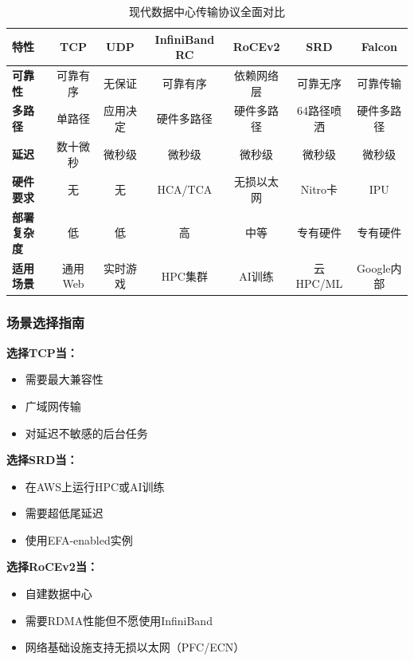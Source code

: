 \begin{table}[h]
\centering
\caption{现代数据中心传输协议全面对比}
\begin{tabular}{p{2.5cm}cccccc}
\toprule
\textbf{特性} & \textbf{TCP} & \textbf{UDP} & \textbf{InfiniBand RC} & \textbf{RoCEv2} & \textbf{SRD} & \textbf{Falcon} \\
\midrule
\textbf{可靠性} & 可靠有序 & 无保证 & 可靠有序 & 依赖网络层 & 可靠无序 & 可靠传输 \\
\textbf{多路径} & 单路径 & 应用决定 & 硬件多路径 & 硬件多路径 & 64路径喷洒 & 硬件多路径 \\
\textbf{延迟} & 数十微秒 & 微秒级 & 微秒级 & 微秒级 & 微秒级 & 微秒级 \\
\textbf{硬件要求} & 无 & 无 & HCA/TCA & 无损以太网 & Nitro卡 & IPU \\
\textbf{部署复杂度} & 低 & 低 & 高 & 中等 & 专有硬件 & 专有硬件 \\
\textbf{适用场景} & 通用Web & 实时游戏 & HPC集群 & AI训练 & 云HPC/ML & Google内部 \\
\bottomrule
\end{tabular}
\end{table}

\subsubsection{场景选择指南}

\textbf{选择TCP当：}
\begin{itemize}
    \item 需要最大兼容性
    \item 广域网传输
    \item 对延迟不敏感的后台任务
\end{itemize}

\textbf{选择SRD当：}
\begin{itemize}
    \item 在AWS上运行HPC或AI训练
    \item 需要超低尾延迟
    \item 使用EFA-enabled实例
\end{itemize}

\textbf{选择RoCEv2当：}
\begin{itemize}
    \item 自建数据中心
    \item 需要RDMA性能但不愿使用InfiniBand
    \item 网络基础设施支持无损以太网（PFC/ECN）
\end{itemize}

